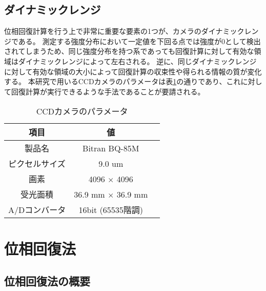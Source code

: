 \subsection{ダイナミックレンジ}
\label{chap3_dynamic_range}

位相回復計算を行う上で非常に重要な要素の1つが、カメラのダイナミックレンジである。
測定する強度分布において一定値を下回る点では強度が0として検出されてしまうため、同じ強度分布を持つ系であっても回復計算に対して有効な領域はダイナミックレンジによって左右される。
逆に、同じダイナミックレンジに対して有効な領域の大小によって回復計算の収束性や得られる情報の質が変化する。
本研究で用いるCCDカメラのパラメータは表\ref{tb:ccd_camera_params}の通りであり、これに対して回復計算が実行できるような手法であることが要請される。

\begin{table}[!ht]
\begin{center}
  \caption{CCDカメラのパラメータ}
  \begin{tabular}{|c|c|l|} \hline
    項目 & 値 \\ \hline
    製品名 & Bitran BQ-85M \\
    ピクセルサイズ & 9.0 um \\
    画素 & 4096 $\times$ 4096 \\
    受光面積 & 36.9 mm $\times$ 36.9 mm \\
    A/Dコンバータ & 16bit (65535階調) \\ \hline
  \end{tabular}
  \label{tb:ccd_camera_params}
\end{center}
\end{table}

\clearpage
\newpage


\section{位相回復法}

\subsection{位相回復法の概要}
\label{chap3_phase_retrieval_introduction}

